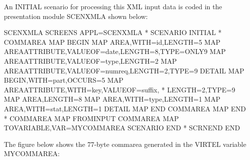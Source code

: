 \documentclass[letterpaper,10pt,english]{sphinxmanual}
\begin{document}

An INITIAL scenario for processing this XML input data is coded in the presentation module SCENXMLA shown below:

\begin{sphinxVerbatim}[commandchars=\\\{\}]
SCENXMLA    SCREENS APPL=SCENXMLA
*
            SCENARIO INITIAL
*
COMMAREA    MAP\PYGZdl{} BEGIN
            MAP\PYGZdl{} AREA,WITH=\PYGZsq{}id\PYGZsq{},LENGTH=5
            MAP\PYGZdl{} AREA\PYGZhy{}ATTRIBUTE,VALUEOF=\PYGZsq{}date\PYGZsq{},LENGTH=8,TYPE=ONLY9
            MAP\PYGZdl{} AREA\PYGZhy{}ATTRIBUTE,VALUEOF=\PYGZsq{}type\PYGZsq{},LENGTH=2
            MAP\PYGZdl{} AREA\PYGZhy{}ATTRIBUTE,VALUEOF=\PYGZsq{}numreq\PYGZsq{},LENGTH=2,TYPE=9
DETAIL      MAP\PYGZdl{} BEGIN,WITH=\PYGZsq{}part\PYGZsq{},OCCURS=5
            MAP\PYGZdl{} AREA\PYGZhy{}ATTRIBUTE,WITH=\PYGZsq{}key\PYGZsq{},VALUEOF=\PYGZsq{}suffix\PYGZsq{},             *
                LENGTH=2,TYPE=9
            MAP\PYGZdl{} AREA,LENGTH=8
            MAP\PYGZdl{} AREA,WITH=\PYGZsq{}type\PYGZsq{},LENGTH=1
            MAP\PYGZdl{} AREA,WITH=\PYGZsq{}stat\PYGZsq{},LENGTH=1
DETAIL      MAP\PYGZdl{} END
COMMAREA    MAP\PYGZdl{} END
*
COMMAREA    MAP\PYGZdl{} FROM\PYGZhy{}INPUT
COMMAREA    MAP\PYGZdl{} TO\PYGZhy{}VARIABLE,VAR=\PYGZsq{}MYCOMMAREA\PYGZsq{}
            SCENARIO END
*
            SCRNEND
END
\end{sphinxVerbatim}


The figure below shows the 77-byte commarea generated in the VIRTEL variable MYCOMMAREA:
\end{document}
